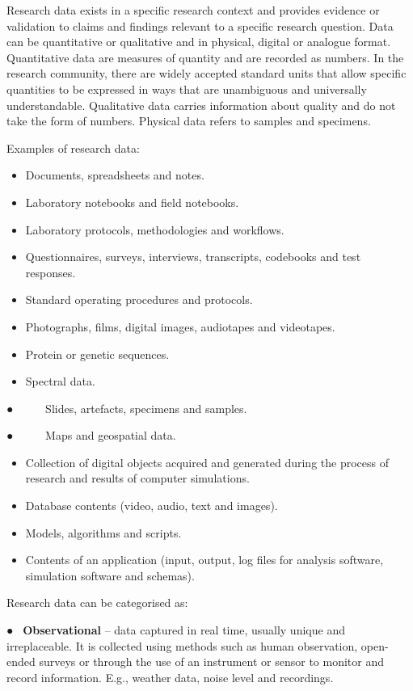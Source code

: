 \documentclass[
]{book}
\providecommand{\tightlist}{%
  \setlength{\itemsep}{0pt}\setlength{\parskip}{0pt}}
\begin{document}
Research data exists in a specific research context and provides evidence or validation to claims and findings relevant to a specific research question. Data can be quantitative or qualitative and in physical, digital or analogue format. Quantitative data are measures of quantity and are recorded as numbers. In the research community, there are widely accepted standard units that allow specific quantities to be expressed in ways that are unambiguous and universally understandable. Qualitative data carries information about quality and do not take the form of numbers. Physical data refers to samples and specimens.

Examples of research data:

\begin{itemize}
\tightlist
\item
  Documents, spreadsheets and notes.
\item
  Laboratory notebooks and field notebooks.
\item
  Laboratory protocols, methodologies and workflows.
\item
  Questionnaires, surveys, interviews, transcripts, codebooks and test responses.
\item
  Standard operating procedures and protocols.
\item
  Photographs, films, digital images, audiotapes and videotapes.
\item
  Protein or genetic sequences.
\item
  Spectral data.
\end{itemize}

● ~ ~ ~ Slides, artefacts, specimens and samples.

● ~ ~ ~ Maps and geospatial data.

\begin{itemize}
\tightlist
\item
  Collection of digital objects acquired and generated during the process of research and results of computer simulations.
\item
  Database contents (video, audio, text and images).
\item
  Models, algorithms and scripts.
\item
  Contents of an application (input, output, log files for analysis software, simulation software and schemas).
\end{itemize}

Research data can be categorised as:

● ~\textbf{Observational} -- data captured in real time, usually unique and irreplaceable. It is collected using methods such as human observation, open-ended surveys or through the use of an instrument or sensor to monitor and record information. E.g., weather data, noise level and recordings.
\end{document}
